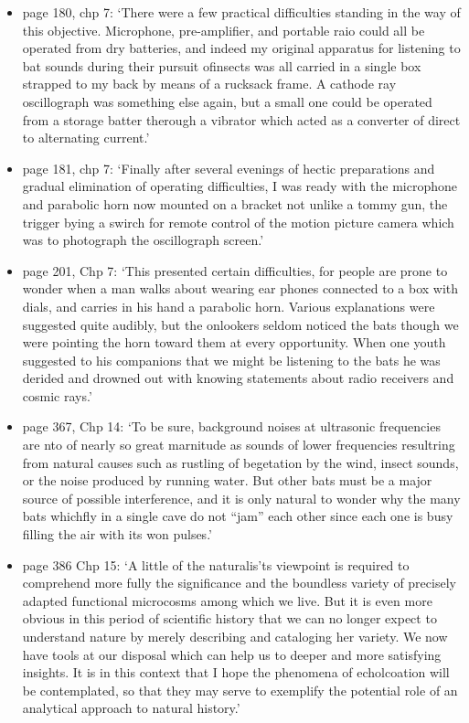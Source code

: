 \documentclass[
]{book}
\begin{document}
\begin{itemize}
\item
  page 180, chp 7: `There were a few practical difficulties standing in the way of this objective. Microphone, pre-amplifier, and portable raio could all be operated from dry batteries, and indeed my original apparatus for listening to bat sounds during their pursuit ofinsects was all carried in a single box strapped to my back by means of a rucksack frame. A cathode ray oscillograph was something else again, but a small one could be operated from a storage batter therough a vibrator which acted as a converter of direct to alternating current.'
\item
  page 181, chp 7: `Finally after several evenings of hectic preparations and gradual elimination of operating difficulties, I was ready with the microphone and parabolic horn now mounted on a bracket not unlike a tommy gun, the trigger bying a swirch for remote control of the motion picture camera which was to photograph the oscillograph screen.'
\item
  page 201, Chp 7: `This presented certain difficulties, for people are prone to wonder when a man walks about wearing ear phones connected to a box with dials, and carries in his hand a parabolic horn. Various explanations were suggested quite audibly, but the onlookers seldom noticed the bats though we were pointing the horn toward them at every opportunity. When one youth suggested to his companions that we might be listening to the bats he was derided and drowned out with knowing statements about radio receivers and cosmic rays.'
\item
  page 367, Chp 14: `To be sure, background noises at ultrasonic frequencies are nto of nearly so great marnitude as sounds of lower frequencies resultring from natural causes such as rustling of begetation by the wind, insect sounds, or the noise produced by running water. But other bats must be a major source of possible interference, and it is only natural to wonder why the many bats whichfly in a single cave do not ``jam'' each other since each one is busy filling the air with its won pulses.'
\item
  page 386 Chp 15: `A little of the naturalis'ts viewpoint is required to comprehend more fully the significance and the boundless variety of precisely adapted functional microcosms among which we live. But it is even more obvious in this period of scientific history that we can no longer expect to understand nature by merely describing and cataloging her variety. We now have tools at our disposal which can help us to deeper and more satisfying insights. It is in this context that I hope the phenomena of echolcoation will be contemplated, so that they may serve to exemplify the potential role of an analytical approach to natural history.'
\end{itemize}
\end{document}
